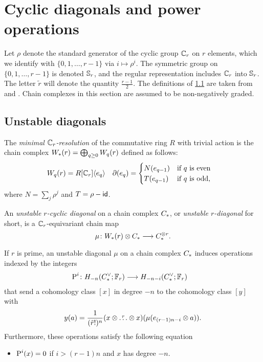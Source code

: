 
\section{Cyclic diagonals and power operations}\label{s:2bdiagonals}

Let $\rho$ denote the standard generator of the cyclic group $\Cyc_r$ on $r$ elements, which we identify with $\{0,1,\dots,r-1\}$ via $i\mapsto \rho^i$.
The symmetric group on $\{0,1,\dots,r-1\}$ is denoted $\Sym_r$, and the regular representation includes $\Cyc_r$ into $\Sym_r$.
The letter $\tilde{r}$ will denote the quantity $\frac{r-1}{2}$.
The definitions of \cref{s:unstable} are taken from \cite{may1970general} and \cite{medina2021may_st}.
Chain complexes in this section are assumed to be non-negatively graded.

\subsection{Unstable diagonals}\label{s:unstable}

The \emph{minimal $\Cyc_r$-resolution} of the commutative ring $R$ with trivial action is the chain complex $\W(r) = \bigoplus_{q \geq 0} \W[q](r)$ defined as follows:
\begin{align*}
	\W[q](r) &= R[\Cyc_r]\langle e_q\rangle &
	\partial(e_q) &= \begin{cases}
		N(e_{q-1}) & \text{if $q$ is even} \\
		T(e_{q-1}) & \text{if $q$ is odd,}
	\end{cases}
\end{align*}
where $N = \sum_j \rho^j$ and $T = \rho - \Id$.

\begin{definition}
	An \emph{unstable $r$-cyclic diagonal} on a chain complex $\ucadenas$, or \emph{unstable $r$-diagonal} for short, is a $\Cyc_r$-equivariant chain map
	\[
	\mu \colon \W(r) \ot \ucadenas \lra \ucadenas^{\ot r}.
	\]
\end{definition}

\begin{proposition}\label{prop:unstable}
	If $r$ is prime, an unstable diagonal $\mu$ on a chain complex $\ucadenas$ induces operations indexed by the integers
	\begin{align*}
		\power^{i} \colon H_{-n}(\ucocadenas;\mathbb{F}_r)& \lra H_{-n-i}(\ucocadenas;\mathbb{F}_r)
	\end{align*}
	that send a cohomology class $[x]$ in degree $-n$ to the cohomology class $[y]$ with
	\[
	y(a) = \frac{1}{(\tilde{r}!)^n}(x \ot \overset{r}{\dots} \ot x)(\mu(e_{(r-1)n-i} \ot a)).
	\]
	Furthermore, these operations satisfy the following equation
	\begin{itemize}
		\item $\power^i(x) = 0$ if $i>(r-1)n$ and $x$ has degree $-n$.
	\end{itemize}
\end{proposition}

